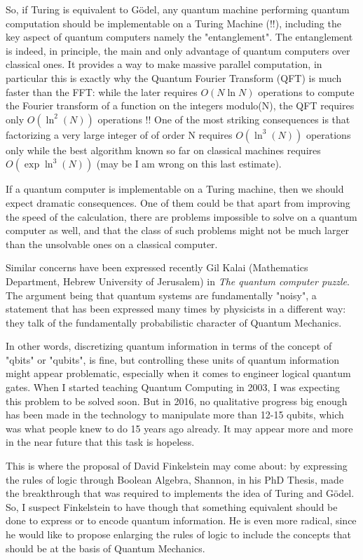    So, if Turing is equivalent to G\"odel, any quantum machine performing quantum
    computation should be implementable on a Turing Machine (!!), including the
    key aspect of quantum computers namely the "entanglement". The entanglement
    is indeed, in principle, the main and only advantage of quantum computers
    over classical ones. It provides a way to make massive parallel computation,
    in particular this is exactly why the Quantum Fourier Transform (QFT) is
    much faster than the FFT: while the later requires $O(N \ln N)$ operations to
    compute the Fourier transform of a function on the integers modulo(N), the
    QFT requires only $O(\ln^2(N))$ operations !! One of the most striking
    consequences is that factorizing a very large integer of of order N requires
    $O(\ln^3(N))$ operations only while the best algorithm known so far on
    classical machines requires $O(\exp{ \ln^3(N)})$ (may be I am wrong on this last
    estimate).


    If a quantum computer is implementable on a Turing machine, then we should
    expect dramatic consequences. One of them could be that apart from improving
    the speed of the calculation, there are problems impossible to solve on a
    quantum computer as well, and that the class of such problems might not be
    much larger than the unsolvable ones on a classical computer.


    Similar concerns have been expressed recently Gil Kalai
    (Mathematics Department, Hebrew University of Jerusalem) in {\em The
    quantum computer puzzle}. The argument being that quantum systems are
    fundamentally "noisy", a statement that has been expressed many times
    by physicists in a different way: they talk of the fundamentally
    probabilistic character of Quantum Mechanics.


    In other words, discretizing quantum information in terms of the concept of
    "qbits" or "qubits", is fine, but controlling these units of quantum
    information might appear problematic, especially when it comes to
    engineer logical quantum gates. When I started teaching Quantum Computing in
    2003, I was expecting this problem to be solved soon. But in 2016, no
    qualitative progress big enough has been made in the technology
    to manipulate more than 12-15 qubits, which was what people knew to do 15
    years ago already. It may appear more and more in the near future that this
    task is hopeless.


    This is where the proposal of David Finkelstein may come about: by
    expressing the rules of logic through Boolean Algebra, Shannon, in his PhD
    Thesis, made the breakthrough that was required to implements the idea of
    Turing and G\"odel. So, I suspect Finkelstein to have though that something
    equivalent should be done to express or to encode quantum information.  He
    is even more radical, since he would like to propose enlarging the rules of
    logic to include the concepts that should be at the basis of Quantum
    Mechanics.


